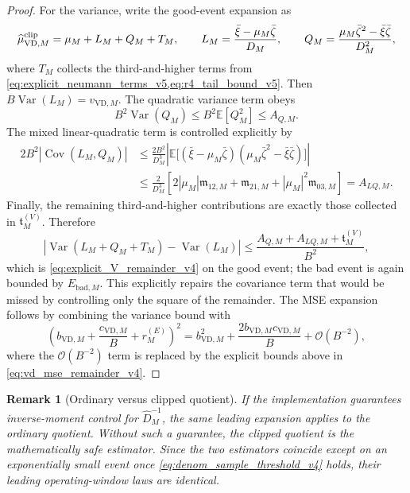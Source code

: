 \documentclass[11pt]{article}
\newtheorem{remark}{Remark}
\newcommand{\Var}{\operatorname{Var}}
\newcommand{\Cov}{\operatorname{Cov}}
\newcommand{\E}{\mathbb{E}}
\newcommand{\1}{\mathbf{1}}
\newcommand{\OO}{\mathcal{O}}
\newcommand{\abs}[1]{\left\lvert #1 \right\rvert}
\begin{document}
\begin{proof}
For the variance, write the good-event expansion as
\begin{equation}
    \widehat\mu^{\rm clip}_{\mathrm{VD},M}
    =\mu_M+L_M+Q_M+T_M,
    \qquad
    L_M=\frac{\bar\xi-\mu_M\bar\zeta}{D_M},
    \qquad
    Q_M=\frac{\mu_M\bar\zeta^2-\bar\xi\bar\zeta}{D_M^2},
\end{equation}
where \(T_M\) collects the third-and-higher terms from \cref{eq:explicit_neumann_terms_v5,eq:r4_tail_bound_v5}.  Then \(B\Var(L_M)=v_{\mathrm{VD},M}\).  The quadratic variance term obeys
\begin{equation}
    B^2\Var(Q_M)
    \le B^2\E[Q_M^2]
    \le A_{Q,M}.
\end{equation}
The mixed linear-quadratic term is controlled explicitly by
\begin{align}
    2B^2\abs{\Cov(L_M,Q_M)}
    &\le \frac{2B^2}{D_M^3}
    \abs{\E\big[(\bar\xi-\mu_M\bar\zeta)(\mu_M\bar\zeta^2-\bar\xi\bar\zeta)\big]} \\
    &\le \frac{2}{D_M^3}
    \left[2\abs{\mu_M}\mathfrak m_{12,M}+\mathfrak m_{21,M}
    +\abs{\mu_M}^2\mathfrak m_{03,M}\right]
    =A_{LQ,M}.
\end{align}
Finally, the remaining third-and-higher contributions are exactly those collected in \(\mathfrak t^{(V)}_M\).  Therefore
\begin{equation}
    \abs{\Var(L_M+Q_M+T_M)-\Var(L_M)}
    \le \frac{A_{Q,M}+A_{LQ,M}+\mathfrak t^{(V)}_M}{B^2},
\end{equation}
which is \cref{eq:explicit_V_remainder_v4} on the good event; the bad event is again bounded by \(E_{\mathrm{bad},M}\).  This explicitly repairs the covariance term that would be missed by controlling only the square of the remainder.  The MSE expansion follows by combining the variance bound with
\begin{equation}
    \left(b_{\mathrm{VD},M}+\frac{c_{\mathrm{VD},M}}{B}+r^{(E)}_M\right)^2
    =b_{\mathrm{VD},M}^2+\frac{2b_{\mathrm{VD},M}c_{\mathrm{VD},M}}{B}+\OO(B^{-2}),
\end{equation}
where the \(\OO(B^{-2})\) term is replaced by the explicit bounds above in \cref{eq:vd_mse_remainder_v4}.
\end{proof}

\begin{remark}[Ordinary versus clipped quotient]
If the implementation guarantees inverse-moment control for \(\widehat D_M^{-1}\), the same leading expansion applies to the ordinary quotient.  Without such a guarantee, the clipped quotient is the mathematically safe estimator.  Since the two estimators coincide except on an exponentially small event once \cref{eq:denom_sample_threshold_v4} holds, their leading operating-window laws are identical.
\end{remark}
\end{document}
